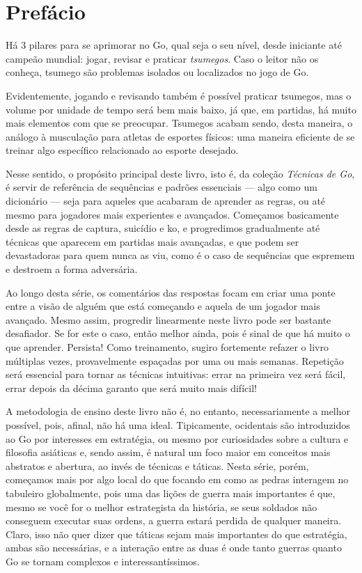 \chapter{Prefácio}

Há 3 pilares para se aprimorar no Go, qual seja o seu nível, desde iniciante até campeão mundial: jogar, revisar e praticar \emph{\glspl{tsumego}}. Caso o leitor não os conheça, tsumego são problemas isolados ou localizados no jogo de Go.

Evidentemente, jogando e revisando também é possível praticar tsumegos, mas o volume por unidade de tempo será bem mais baixo, já que, em partidas, há muito mais elementos com que se preocupar. Tsumegos acabam sendo, desta maneira, o análogo à musculação para atletas de esportes físicos: uma maneira eficiente de se treinar algo específico relacionado ao esporte desejado.

Nesse sentido, o propósito principal deste livro, isto é, da coleção \emph{Técnicas de Go}, é servir de referência de sequências e padrões essenciais --- algo como um dicionário --- seja para aqueles que acabaram de aprender as regras, ou até mesmo para jogadores mais experientes e avançados. Começamos basicamente desde as regras de captura, suicídio e ko, e progredimos gradualmente até técnicas que aparecem em partidas mais avançadas, e que podem ser devastadoras para quem nunca as viu, como é o caso de sequências que espremem e destroem a forma adversária. 

Ao longo desta série, os comentários das respostas focam em criar uma ponte entre a visão de alguém que está começando e aquela de um jogador mais avançado. Mesmo assim, progredir linearmente neste livro pode ser bastante desafiador. Se for este o caso, então melhor ainda, pois é sinal de que há muito o que aprender. Persista! Como treinamento, sugiro fortemente refazer o livro múltiplas vezes, provavelmente espaçadas por uma ou mais semanas. Repetição será essencial para tornar as técnicas intuitivas: errar na primeira vez será fácil, errar depois da décima garanto que será muito mais difícil!

A metodologia de ensino deste livro não é, no entanto, necessariamente a melhor possível, pois, afinal, não há uma ideal. Tipicamente, ocidentais são introduzidos ao Go por interesses em estratégia, ou mesmo por curiosidades sobre a cultura e filosofia asiáticas e, sendo assim, é natural um foco maior em conceitos mais abstratos e abertura, ao invés de técnicas e táticas. Nesta série, porém, começamos mais por algo local do que focando em como as pedras interagem no tabuleiro globalmente, pois uma das lições de guerra mais importantes é que, mesmo se você for o melhor estrategista da história, se seus soldados não conseguem executar suas ordens, a guerra estará perdida de qualquer maneira. Claro, isso não quer dizer que táticas sejam mais importantes do que estratégia, ambas são necessárias, e a interação entre as duas é onde tanto guerras quanto Go se tornam complexos e interessantíssimos.

